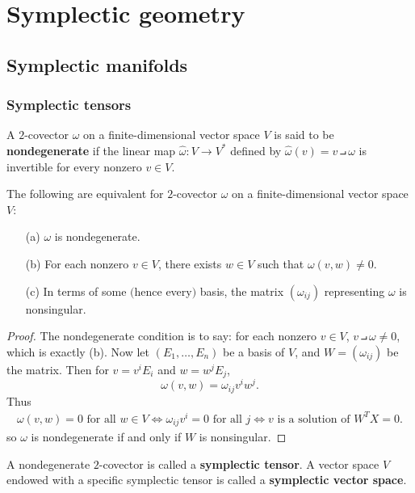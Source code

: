 \chapter{Symplectic geometry}
\section{Symplectic manifolds}
\subsection{Symplectic tensors}
A $2$-covector $\omega$ on a finite-dimensional vector space $V$ is said to be \textbf{nondegenerate} if the linear map $\widehat{\omega}:V\to V^*$ defined by $\widehat{\omega}(v)=v\intprod\omega$ is invertible for every nonzero $v\in V$.

\begin{proposition}
The following are equivalent for $2$-covector $\omega$ on a finite-dimensional vector space $V$:
\begin{enumerate}
\item[(a)] $\omega$ is nondegenerate.
\item[(b)] For each nonzero $v\in V$, there exists $w\in V$ such that $\omega(v,w)\neq 0$.
\item[(c)] In terms of some $($hence every$)$ basis, the matrix $(\omega_{ij})$ representing $\omega$ is nonsingular.
\end{enumerate}
\end{proposition}
\begin{proof}
The nondegenerate condition is to say: for each nonzero $v\in V$, $v\intprod\omega\neq0$, which is exactly (b). Now let $(E_1,\dots,E_n)$ be a basis of $V$, and $W=(\omega_{ij})$ be the matrix. Then for $v=v^iE_i$ and $w=w^jE_j$,
\[\omega(v,w)=\omega_{ij}v^iw^j.\]
Thus
\begin{align*}
\omega(v,w)=0\text{ for all $w\in V$}\iff \omega_{ij}v^i=0\text{ for all $j$}\iff\text{$v$ is a solution of $W^TX=0$}.
\end{align*}
so $\omega$ is nondegenerate if and only if $W$ is nonsingular.
\end{proof}

A nondegenerate $2$-covector is called a \textbf{symplectic tensor}. A vector space $V$ endowed with a specific symplectic tensor is called a \textbf{symplectic vector space}.


